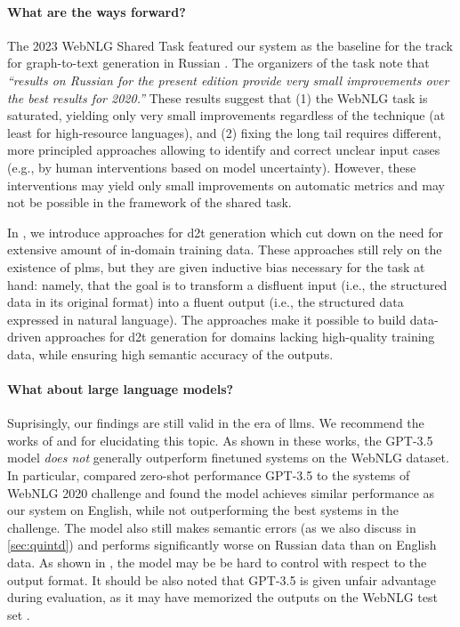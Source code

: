 \paragraph{What are the ways forward?} The 2023 WebNLG Shared Task featured our system as the baseline for the track for graph-to-text generation in Russian \cite{cripwell2023WebNLGShared2023}. The organizers of the task note that \textit{``results on Russian for the present edition provide very small improvements over the best results for 2020.''} These results suggest that (1) the WebNLG task is saturated, yielding only very small improvements regardless of the technique (at least for high-resource languages), and (2) fixing the long tail requires different, more principled approaches allowing to identify and correct unclear input cases (e.g., by human interventions based on model uncertainty). However, these interventions may yield only small improvements on automatic metrics and may not be possible in the framework of the shared task.


In , we introduce approaches for \ac{d2t} generation which cut down on the need for extensive amount of in-domain training data. These approaches still rely on the existence of \acp{plm}, but they are given inductive bias necessary for the task at hand: namely, that the goal is to transform a disfluent input (i.e., the structured data in its original format) into a fluent output (i.e., the structured data expressed in natural language). The approaches make it possible to build data-driven approaches for \ac{d2t} generation for domains lacking high-quality training data, while ensuring high semantic accuracy of the outputs.



\paragraph{What about large language models?} Suprisingly, our findings are still valid in the era of \acp{llm}. We recommend the works of \citet{axelssonUsingLargeLanguage2023} and \citet{yuanEvaluatingGenerativeModels2023} for elucidating this topic. As shown in these works, the GPT-3.5 model \cite{chatgpt} \emph{does not} generally outperform finetuned systems on the WebNLG dataset. In particular, \citet{axelssonUsingLargeLanguage2023} compared zero-shot performance GPT-3.5 to the systems of WebNLG 2020 challenge and found the model achieves similar performance as our system on English, while not outperforming the best systems in the challenge. The model also still makes semantic errors (as we also discuss in \autoref{sec:quintd}) and performs significantly worse on Russian data than on English data. As shown in \citet{yuanEvaluatingGenerativeModels2023}, the model may be be hard to control with respect to the output format. It should be also noted that GPT-3.5 is given unfair advantage during evaluation, as it may have memorized the outputs on the WebNLG test set \cite{balloccu2024leak}.



